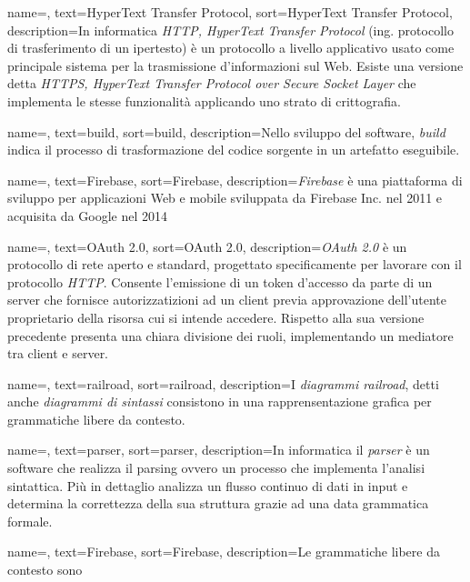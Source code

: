 {
	name=,
	text=HyperText Transfer Protocol,
	sort=HyperText Transfer Protocol,
	description={In informatica \emph{HTTP, HyperText Transfer Protocol} (ing. protocollo di trasferimento di un ipertesto) è un protocollo a livello applicativo usato come principale sistema per la trasmissione d'informazioni sul Web. Esiste una versione detta \emph{HTTPS, HyperText Transfer Protocol over Secure Socket Layer} che implementa le stesse funzionalità applicando uno strato di crittografia.}
}

{
	name=,
	text=build,
	sort=build,
	description={Nello sviluppo del software, \emph{build} indica il processo di trasformazione del codice sorgente in un artefatto eseguibile.}
}

{
	name=,
	text=Firebase,
	sort=Firebase,
	description={\emph{Firebase} è una piattaforma di sviluppo per applicazioni Web e mobile sviluppata da Firebase Inc. nel 2011 e acquisita da Google nel 2014}
}

{
	name=,
	text=OAuth 2.0,
	sort=OAuth 2.0,
	description={\emph{OAuth 2.0} è un protocollo di rete aperto e standard, progettato specificamente per lavorare con il protocollo \emph{HTTP}. Consente l'emissione di un token d'accesso da parte di un server che fornisce autorizzatizioni ad un client previa approvazione dell'utente proprietario della risorsa cui si intende accedere. Rispetto alla sua versione precedente presenta una chiara divisione dei ruoli, implementando un mediatore tra client e server.}
}

{
	name=,
	text=railroad,
	sort=railroad,
	description={I \emph{diagrammi railroad}, detti anche \emph{diagrammi di sintassi} consistono in una rapprensentazione grafica per grammatiche libere da contesto.}
}

{
	name=,
	text=parser,
	sort=parser,
	description={In informatica il \emph{parser} è un software che realizza il parsing ovvero un processo che implementa l'analisi sintattica. Più in dettaglio analizza un flusso continuo di dati in input e determina la correttezza della sua struttura grazie ad una data grammatica formale.}
}

{
	name=,
	text=Firebase,
	sort=Firebase,
	description={Le grammatiche libere da contesto sono }
}
